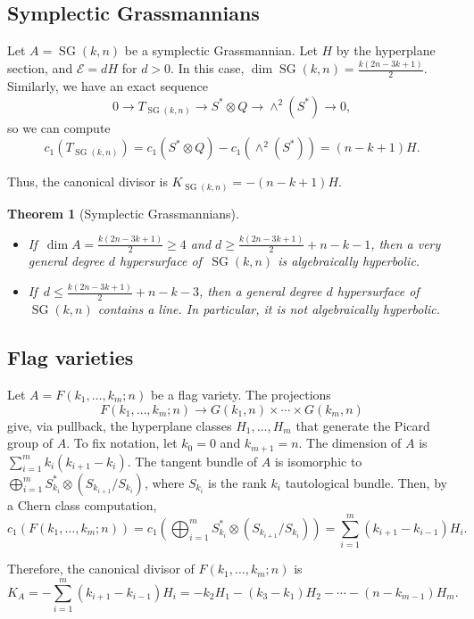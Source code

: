 \documentclass[11pt]{amsart}
\numberwithin{equation}{section}
\newtheorem{theorem}{Theorem}[section]
\theoremstyle{definition}
\theoremstyle{remark}
\DeclareMathOperator{\SG}{SG}
\newcommand{\lra}{\longrightarrow}
\begin{document}
\subsection{Symplectic Grassmannians}

Let $A = \SG(k,n)$ be a symplectic Grassmannian. Let $H$ by the hyperplane section, and $\mathcal{E} = dH$ for $d>0$. In this case, $\dim \SG(k,n) = \frac{k(2n-3k+1)}{2}$. Similarly, we have an exact sequence
\[ 0\longrightarrow T_{\SG(k,n)}\longrightarrow S^*\otimes Q\longrightarrow \wedge^2(S^*)\longrightarrow 0, \]
so we can compute
\[ c_1(T_{\SG(k,n)}) = c_1(S^*\otimes Q) - c_1(\wedge^2 (S^*)) = (n-k+1)H. \]

Thus, the canonical divisor is $K_{\SG(k,n)} = -(n-k+1)H$.

\begin{theorem}[Symplectic Grassmannians]
  \leavevmode
    \begin{itemize}
        \item If\, $\dim A=\frac{k(2n-3k+1)}{2}\ge 4$ and $d\ge \frac{k(2n-3k+1)}{2}+n-k-1$, then a very general degree $d$ hypersurface of\, $\SG(k,n)$ is algebraically hyperbolic.
        \item If\, $d\le \frac{k(2n-3k+1)}{2}+n-k-3$, then a general degree $d$ hypersurface of $\SG(k,n)$ contains a line. In particular, it is not algebraically hyperbolic.
    \end{itemize}
\end{theorem}

\subsection{Flag varieties}

Let $A = F(k_1, \hdots, k_m; n)$ be a flag variety. The projections
\[ F(k_1, \hdots, k_m; n)\lra G(k_1,n)\times \cdots \times G(k_m,n) \]
give, via pullback, the hyperplane classes $H_1, \hdots , H_m$ that generate the Picard group of $A$. To fix notation, let $k_0 = 0$ and $k_{m+1} = n$. The dimension of $A$ is $\sum_{i=1}^{m}k_{i}(k_{i+1}-k_i)$. The tangent bundle of $A$ is isomorphic to $\bigoplus_{i=1}^m S_{k_i}^*\otimes (S_{k_{i+1}}/S_{k_i})$, where $S_{k_i}$ is the rank $k_i$ tautological bundle. Then, by a Chern class computation,
\[ c_1(F(k_1, \hdots, k_m; n)) = c_1\left (\bigoplus_{i=1}^m S_{k_i}^*\otimes (S_{k_{i+1}}/S_{k_i})\right ) = \sum_{i=1}^m (k_{i+1}-k_{i-1})H_i. \]

Therefore, the canonical divisor of $F(k_1, \hdots, k_m; n)$ is
\[K_A = - \sum_{i=1}^{m}(k_{i+1}-k_{i-1})H_{i} = -k_2H_1 - (k_3-k_1)H_2 - \cdots - (n-k_{m-1})H_m.\]
\end{document}

